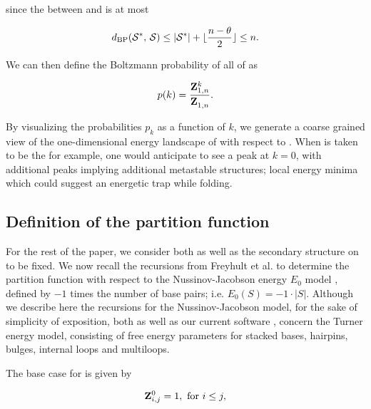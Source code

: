 since the \bpd between \strSt and \str is at most

\begin{align}
\label{eq:fftbor:maxDist}
\dBP{\strSt}{\str} \leq |\strSt| + \lfloor \frac{n-\theta}{2} \rfloor \leq n.
\end{align}

We can then define the Boltzmann probability of all \kNbrs of \strSt as

\begin{align}
\label{eq:fftbor:probK}
p(k) =\frac{\bfZ{k}{1,n}}{\bfZ{}{1,n}}.
\end{align}

By visualizing the probabilities $p_k$ as a function of $k$, we generate a
coarse grained view of the one-dimensional energy landscape of \seq with
respect to \strSt. When \strSt is taken to be the \mfes for example, one would
anticipate to see a peak at $k=0$, with additional peaks implying additional
metastable structures; local energy minima which could suggest an energetic
trap while folding.

\subsection{Definition of the partition function
\texorpdfstring{}{}}
\label{subsec:fftbor:recursions}

For the rest of the paper, we consider both \seq as well as the
secondary structure \strSt on \seq to be fixed. We now recall the
recursions from Freyhult et al. \cite{Freyhult.ab05} to determine
the partition function  with
respect to the Nussinov-Jacobson
energy $E_0$ model \cite{nussinovJacobson}, defined by
$-1$ times the number of base pairs; i.e. $E_0(S) = -1 \cdot |S|$.
Although we describe here the recursions for the Nussinov-Jacobson
model, for the sake of
simplicity of exposition, both \rnabor
\cite{Freyhult.ab05} as well as our current software \fftbor,
concern the Turner energy model, consisting of free energy parameters for
stacked bases, hairpins, bulges, internal loops and multiloops.


The base case for  is given by

\begin{align}
\label{eq:fftbor:initZpart1}
\bfZ{0}{i,j} = 1, \text{ for } i \le j,
\end{align}


